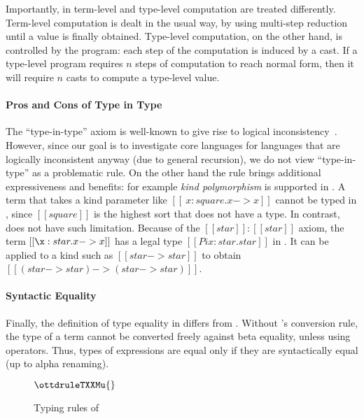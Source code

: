 Importantly, in \name term-level and type-level computation are treated 
differently. Term-level computation is dealt in the usual way, by 
using multi-step reduction until a value is finally obtained. 
Type-level computation, on the other hand, is controlled by the program:
each step of the computation is induced by a cast. If a type-level 
program requires $n$ steps of computation to reach normal form, 
then it will require $n$ casts to compute a type-level value.

\paragraph{Pros and Cons of Type in Type}
The ``type-in-type'' axiom is well-known to give rise 
to logical inconsistency~\cite{systemfw}. However, since our goal is to 
investigate core languages for languages that are logically
inconsistent anyway (due to general recursion), we do not view 
``type-in-type''  as a problematic rule.
On the other hand the rule  brings additional
expressiveness and benefits:
for example \emph{kind polymorphism} is supported in \name.
A term that takes a kind parameter like $[[\
    x:square.x->x]]$ cannot be typed in \cc, since $[[square]]$ is
the highest sort that does not have a type.
In contrast, \name does not have such limitation. Because of
the $[[star]]:[[star]]$ axiom, the term $[[\x:star.x->x]]$ has a legal 
type $[[Pi x:star.star]]$ in \name. It can be applied to 
a kind such as $[[star -> star]]$
to obtain $[[(star->star) -> (star -> star)]]$.

\paragraph{Syntactic Equality}
Finally, the definition of type equality in \name differs from
\cc. Without \cc's conversion rule, the type of a term cannot be
converted freely against beta equality, unless using \cast
operators. Thus, types of expressions are equal only if they are
syntactically equal (up to alpha renaming).

\begin{figure}[t]
\footnotesize
\centering
\begin{spacing}{1.0}
\renewcommand{\ottdrule}[4][]{{\inferrule{#2 }{#3}\,\ottdrulename{#4}}}
\renewenvironment{ottdefnblock}[3][]{\raggedright \framebox{\mbox{#2}} \quad #3 \\[0pt]}{}
\renewcommand{\ottusedrule}[1]{$#1\quad$}
    \ottdefnctx{}\ottinterrule
    \ottdefnexpr{}
    \ottusedrule{\ottdruleTXXMu{}}
\end{spacing}
    \caption{Typing rules of \name}
    \label{fig:ecore:typing}
\end{figure}

